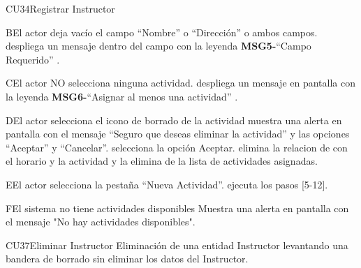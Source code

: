 \begin{UseCase}{CU34}{Registrar Instructor}
{%
		\begin{UCtrayectoriaA}{B}{El actor deja vacío el campo “Nombre” o “Dirección” o ambos campos.}
			\UCpaso despliega un mensaje dentro del campo con la leyenda {\bf MSG5-}``Campo Requerido'' .
		\end{UCtrayectoriaA}
		\begin{UCtrayectoriaA}{C}{El actor NO selecciona ninguna actividad.}
			\UCpaso despliega un mensaje en pantalla con la leyenda {\bf MSG6-}``Asignar al menos una actividad'' .
		\end{UCtrayectoriaA}
		\begin{UCtrayectoriaA}{D}{El actor selecciona el icono de borrado de la actividad }
			\UCpaso muestra una alerta en pantalla con el mensaje “Seguro que deseas eliminar la actividad” y las opciones “Aceptar” y “Cancelar”.
		    \UCpaso[\UCactor] selecciona la opción Aceptar.
		    \UCpaso elimina la relacion de con el horario y la actividad y la elimina de la lista de actividades asignadas.
		\end{UCtrayectoriaA}
		\begin{UCtrayectoriaA}{E}{El actor selecciona la pestaña “Nueva Actividad”.}
			\UCpaso ejecuta los pasos [5-12].
		\end{UCtrayectoriaA}
		\begin{UCtrayectoriaA}{F}{El sistema no tiene actividades disponibles}
			\UCpaso Muestra una alerta en pantalla con el mensaje "No hay actividades disponibles".
		\end{UCtrayectoriaA}		
\begin{UseCase}{CU37}{Eliminar Instructor}{
		Eliminación de una entidad Instructor levantando una bandera de borrado sin eliminar los datos del Instructor.
	}
\end{UseCase}}
\end{UseCase}
